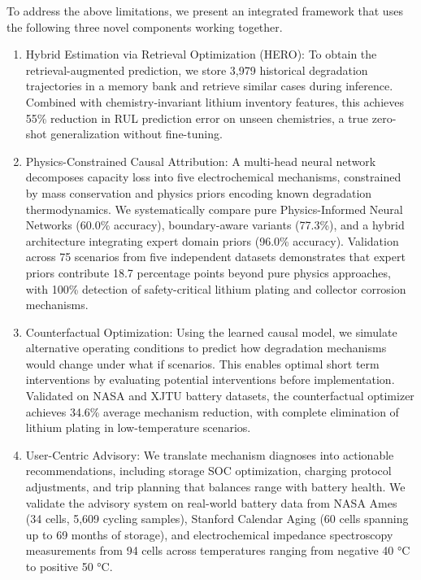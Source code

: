 \documentclass[5p,times,authoryear]{elsarticle}
\begin{document}
To address the above limitations, we present an integrated framework that uses the following three novel components working together.

\begin{enumerate}[(\alph*)]
    \item {Hybrid Estimation via Retrieval Optimization (HERO):} To obtain the retrieval-augmented prediction, we store 3,979 historical degradation trajectories in a memory bank and retrieve similar cases during inference. Combined with chemistry-invariant lithium inventory features, this achieves 55\% reduction in RUL prediction error on unseen chemistries, a true zero-shot generalization without fine-tuning.
    
    \item {Physics-Constrained Causal Attribution:} A multi-head neural network decomposes capacity loss into five electrochemical mechanisms, constrained by mass conservation and physics priors encoding known degradation thermodynamics. We systematically compare pure Physics-Informed Neural Networks (60.0\% accuracy), boundary-aware variants (77.3\%), and a hybrid architecture integrating expert domain priors (96.0\% accuracy). Validation across 75 scenarios from five independent datasets demonstrates that expert priors contribute 18.7 percentage points beyond pure physics approaches, with 100\% detection of safety-critical lithium plating and collector corrosion mechanisms.

     \item {Counterfactual Optimization:} Using the learned causal model, we simulate alternative operating conditions to predict how degradation mechanisms would change under what if scenarios. This enables optimal short term interventions by evaluating potential interventions before implementation. Validated on NASA and XJTU battery datasets, the counterfactual optimizer achieves 34.6\% average mechanism reduction, with complete elimination of lithium plating in low-temperature scenarios.
    
    
    \item {User-Centric Advisory:} We translate mechanism diagnoses into actionable recommendations, including storage SOC optimization, charging protocol adjustments, and trip planning that balances range with battery health. We validate the advisory system on real-world battery data from NASA Ames (34 cells, 5,609 cycling samples), Stanford Calendar Aging (60 cells spanning up to 69 months of storage), and electrochemical impedance spectroscopy measurements from 94 cells across temperatures ranging from negative 40 °C to positive 50 °C.
\end{enumerate}
\end{document}
